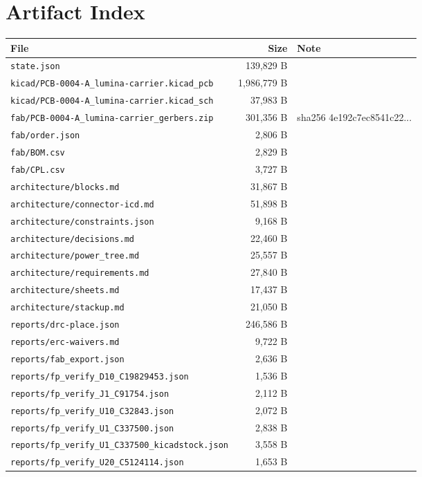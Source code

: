\documentclass[11pt,a4paper]{article}
\begin{document}
\section{Artifact Index}
{\small
\begin{longtable}{p{9cm}rp{4cm}}
\toprule
\textbf{File} & \textbf{Size} & \textbf{Note} \\
\midrule
\endhead
\texttt{state.json} & 139,829 B &  \\
\texttt{kicad/PCB-0004-A\_lumina-carrier.kicad\_pcb} & 1,986,779 B &  \\
\texttt{kicad/PCB-0004-A\_lumina-carrier.kicad\_sch} & 37,983 B &  \\
\texttt{fab/PCB-0004-A\_lumina-carrier\_gerbers.zip} & 301,356 B & sha256 4e192c7ec8541c22... \\
\texttt{fab/order.json} & 2,806 B &  \\
\texttt{fab/BOM.csv} & 2,829 B &  \\
\texttt{fab/CPL.csv} & 3,727 B &  \\
\texttt{architecture/blocks.md} & 31,867 B &  \\
\texttt{architecture/connector-icd.md} & 51,898 B &  \\
\texttt{architecture/constraints.json} & 9,168 B &  \\
\texttt{architecture/decisions.md} & 22,460 B &  \\
\texttt{architecture/power\_tree.md} & 25,557 B &  \\
\texttt{architecture/requirements.md} & 27,840 B &  \\
\texttt{architecture/sheets.md} & 17,437 B &  \\
\texttt{architecture/stackup.md} & 21,050 B &  \\
\texttt{reports/drc-place.json} & 246,586 B &  \\
\texttt{reports/erc-waivers.md} & 9,722 B &  \\
\texttt{reports/fab\_export.json} & 2,636 B &  \\
\texttt{reports/fp\_verify\_D10\_C19829453.json} & 1,536 B &  \\
\texttt{reports/fp\_verify\_J1\_C91754.json} & 2,112 B &  \\
\texttt{reports/fp\_verify\_U10\_C32843.json} & 2,072 B &  \\
\texttt{reports/fp\_verify\_U1\_C337500.json} & 2,838 B &  \\
\texttt{reports/fp\_verify\_U1\_C337500\_kicadstock.json} & 3,558 B &  \\
\texttt{reports/fp\_verify\_U20\_C5124114.json} & 1,653 B &  \\

\end{longtable}}
\end{document}
